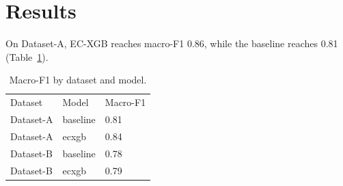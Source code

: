 \section{Results}
On Dataset-A, EC-XGB reaches macro-F1 0.86, while the baseline reaches 0.81 (Table~\ref{tab:main}).

\begin{table}[t]
\caption{Macro-F1 by dataset and model.}
\label{tab:main}
\begin{tabular}{lll}
Dataset & Model & Macro-F1 \\
Dataset-A & baseline & 0.81 \\
Dataset-A & ecxgb & 0.84 \\
Dataset-B & baseline & 0.78 \\
Dataset-B & ecxgb & 0.79 \\
\end{tabular}
\end{table}
